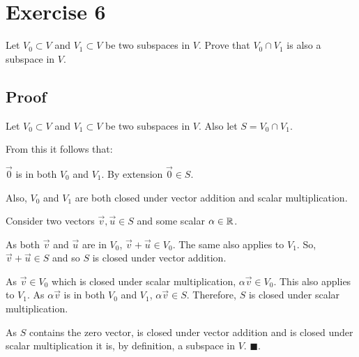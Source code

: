 \section*{Exercise 6}

Let $V_0 \subset V$ and $V_1 \subset V$ be two subspaces in $V$. Prove that $V_0 \cap V_1$ is also a subspace in $V$.

\subsection*{Proof}

Let $V_0 \subset V$ and $V_1 \subset V$ be two subspaces in $V$. Also let $S = V_0 \cap V_1$.

From this it follows that:

$\vec{0}$ is in both $V_0$ and $V_1$. By extension $\vec{0} \in S$.

Also, $V_0$ and $V_1$ are both closed under vector addition and scalar multiplication.

Consider two vectors $\vec{v}, \vec{u} \in S$ and some scalar $\alpha \in \mathbb{R}$. 

As both $\vec{v}$ and $\vec{u}$ are in $V_0$, $\vec{v} + \vec{u} \in V_0$. The same also applies to $V_1$. So, $\vec{v} + \vec{u} \in S$ and so $S$ is closed under vector addition.

As $\vec{v} \in V_0$ which is closed under scalar multiplication, $\alpha \vec{v} \in V_0$. This also applies to $V_1$. As $\alpha \vec{v}$ is in both $V_0$ and $V_1$, $\alpha \vec{v} \in S$. Therefore, $S$ is closed under scalar multiplication.

As $S$ contains the zero vector, is closed under vector addition and is closed under scalar multiplication it is, by definition, a subspace in $V$. $\blacksquare$.
